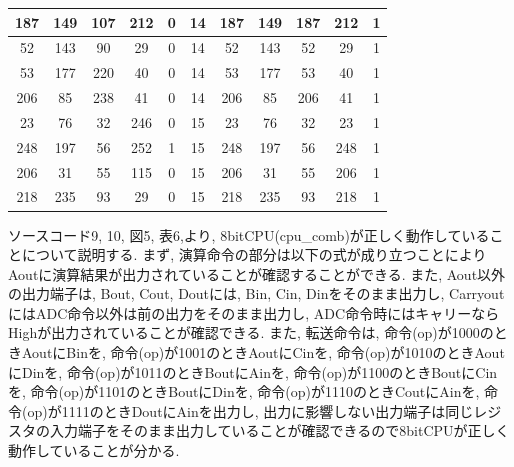 \documentclass[12pt]{jreport}
\begin{document}
\begin{table}[H]
\begin{center}
\begin{tabular} {|c|c|c|c|c|c|c|c|c|c|c|}
                    187 & 149 & 107 & 212 & 0 & 14 & 187 & 149 & 187 & 212 & 1 \\ \hline
                    52 & 143 & 90 & 29 & 0 & 14 & 52 & 143 & 52 & 29 & 1 \\ \hline
                    53 & 177 & 220 & 40 & 0 & 14 & 53 & 177 & 53 & 40 & 1 \\ \hline
                    206 & 85 & 238 & 41 & 0 & 14 & 206 & 85 & 206 & 41 & 1 \\ \hline

                    23 & 76 & 32 & 246 & 0 & 15 & 23 & 76 & 32 & 23 & 1 \\ \hline
                    248 & 197 & 56 & 252 & 1 & 15 & 248 & 197 & 56 & 248 & 1 \\ \hline
                    206 & 31 & 55 & 115 & 0 & 15 & 206 & 31 & 55 & 206 & 1 \\ \hline
                    218 & 235 & 93 & 29 & 0 & 15 & 218 & 235 & 93 & 218 & 1 \\ \hline
                \end{tabular}
            \end{center}
        \end{table}

        ソースコード9, 10, 図5, 表6,より, 8bitCPU(cpu\_comb)が正しく動作していることについて説明する. まず, 演算命令の部分は以下の式が成り立つことによりAoutに演算結果が出力されていることが確認することができる. また, Aout以外の出力端子は, Bout, Cout, Doutには, Bin, Cin, Dinをそのまま出力し, CarryoutにはADC命令以外は前の出力をそのまま出力し, ADC命令時にはキャリーならHighが出力されていることが確認できる. また, 転送命令は, 命令(op)が1000のときAoutにBinを, 命令(op)が1001のときAoutにCinを, 命令(op)が1010のときAoutにDinを, 命令(op)が1011のときBoutにAinを, 命令(op)が1100のときBoutにCinを, 命令(op)が1101のときBoutにDinを, 命令(op)が1110のときCoutにAinを, 命令(op)が1111のときDoutにAinを出力し, 出力に影響しない出力端子は同じレジスタの入力端子をそのまま出力していることが確認できるので8bitCPUが正しく動作していることが分かる. 
\end{document}

